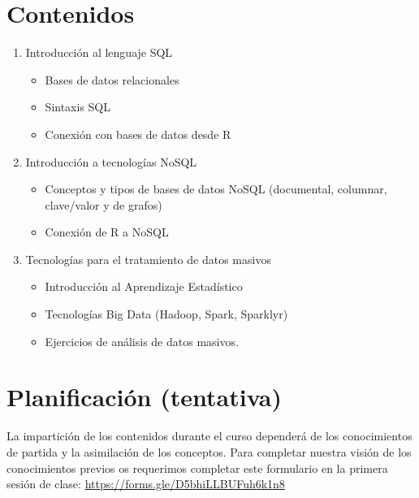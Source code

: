 \documentclass[
]{book}
\providecommand{\tightlist}{%
  \setlength{\itemsep}{0pt}\setlength{\parskip}{0pt}}
\begin{document}
\section{Contenidos}\label{contenidos}

\begin{enumerate}
\def\labelenumi{\arabic{enumi}.}
\tightlist
\item
  Introducción al lenguaje SQL

  \begin{itemize}
  \tightlist
  \item
    Bases de datos relacionales
  \item
    Sintaxis SQL
  \item
    Conexión con bases de datos desde R
  \end{itemize}
\item
  Introducción a tecnologías NoSQL

  \begin{itemize}
  \tightlist
  \item
    Conceptos y tipos de bases de datos NoSQL (documental, columnar, clave/valor y de grafos)
  \item
    Conexión de R a NoSQL
  \end{itemize}
\item
  Tecnologías para el tratamiento de datos masivos

  \begin{itemize}
  \tightlist
  \item
    Introducción al Aprendizaje Estadístico
  \item
    Tecnologías Big Data (Hadoop, Spark, Sparklyr)
  \item
    Ejercicios de análisis de datos masivos.
  \end{itemize}
\end{enumerate}

\section{Planificación (tentativa)}\label{planificaciuxf3n-tentativa}

La impartición de los contenidos durante el curso dependerá de los conocimientos de partida y la asimilación de los
conceptos. Para completar nuestra visión de los conocimientos previos os requerimos completar este formulario en la primera sesión de clase: \url{https://forms.gle/D5bhiLLBUFuh6k1n8}
\end{document}
